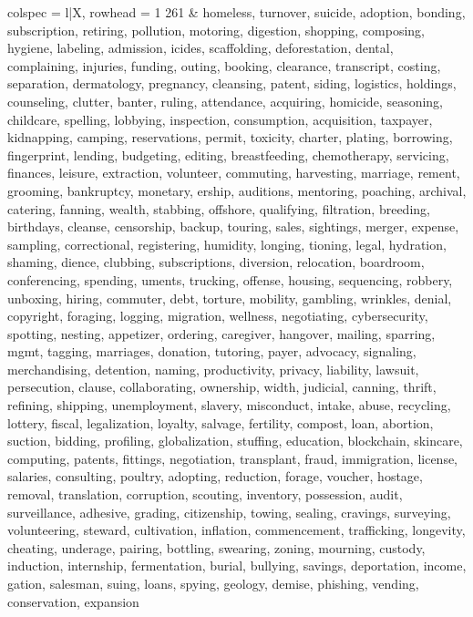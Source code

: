 \begin{tblr}[
  long,
  caption = {Examples from SNLI.},
  entry = {Short Caption},
  label = {tblr:test},
]{
colspec = {l|X},
rowhead = 1}
261 & homeless, turnover, suicide, adoption, bonding, subscription, retiring, pollution, motoring, digestion, shopping, composing, hygiene, labeling, admission, icides, scaffolding, deforestation, dental, complaining, injuries, funding, outing, booking, clearance, transcript, costing, separation, dermatology, pregnancy, cleansing, patent, siding, logistics, holdings, counseling, clutter, banter, ruling, attendance, acquiring, homicide, seasoning, childcare, spelling, lobbying, inspection, consumption, acquisition, taxpayer, kidnapping, camping, reservations, permit, toxicity, charter, plating, borrowing, fingerprint, lending, budgeting, editing, breastfeeding, chemotherapy, servicing, finances, leisure, extraction, volunteer, commuting, harvesting, marriage, rement, grooming, bankruptcy, monetary, ership, auditions, mentoring, poaching, archival, catering, fanning, wealth, stabbing, offshore, qualifying, filtration, breeding, birthdays, cleanse, censorship, backup, touring, sales, sightings, merger, expense, sampling, correctional, registering, humidity, longing, tioning, legal, hydration, shaming, dience, clubbing, subscriptions, diversion, relocation, boardroom, conferencing, spending, uments, trucking, offense, housing, sequencing, robbery, unboxing, hiring, commuter, debt, torture, mobility, gambling, wrinkles, denial, copyright, foraging, logging, migration, wellness, negotiating, cybersecurity, spotting, nesting, appetizer, ordering, caregiver, hangover, mailing, sparring, mgmt, tagging, marriages, donation, tutoring, payer, advocacy, signaling, merchandising, detention, naming, productivity, privacy, liability, lawsuit, persecution, clause, collaborating, ownership, width, judicial, canning, thrift, refining, shipping, unemployment, slavery, misconduct, intake, abuse, recycling, lottery, fiscal, legalization, loyalty, salvage, fertility, compost, loan, abortion, suction, bidding, profiling, globalization, stuffing, education, blockchain, skincare, computing, patents, fittings, negotiation, transplant, fraud, immigration, license, salaries, consulting, poultry, adopting, reduction, forage, voucher, hostage, removal, translation, corruption, scouting, inventory, possession, audit, surveillance, adhesive, grading, citizenship, towing, sealing, cravings, surveying, volunteering, steward, cultivation, inflation, commencement, trafficking, longevity, cheating, underage, pairing, bottling, swearing, zoning, mourning, custody, induction, internship, fermentation, burial, bullying, savings, deportation, income, gation, salesman, suing, loans, spying, geology, demise, phishing, vending, conservation, expansion \\\midrule

\end{tblr}
